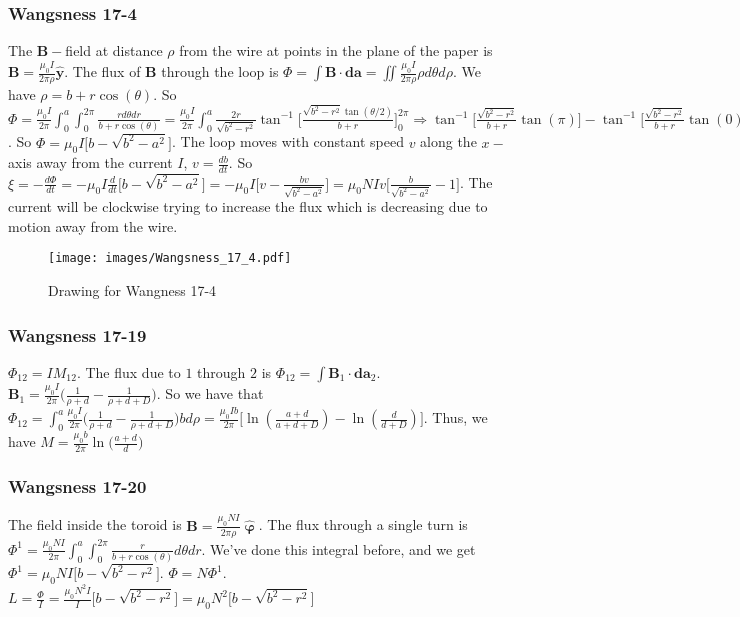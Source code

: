             \subsubsection{Wangsness 17-4}
            The $\mathbf{B}-$field at distance $\rho$ from the wire at points in the plane of the paper is $\mathbf{B} = \frac{\mu_0 I}{2\pi \rho} \hat{\mathbf{y}}$. The flux of $\mathbf{B}$ through the loop is $\Phi = \int \mathbf{B}\cdot \mathbf{da} = \iint \frac{\mu_0 I}{2\pi \rho}\rho d\theta d\rho$. We have $\rho = b+r\cos(\theta)$. So $\Phi = \frac{\mu_0 I}{2\pi} \int_{0}^{a} \int_{0}^{2\pi} \frac{r d\theta dr}{b+r\cos(\theta)} = \frac{\mu_0 I}{2\pi} \int_{0}^{a} \frac{2r}{\sqrt{b^2-r^2}}\tan^{-1}\big[\frac{\sqrt{b^2-r^2}\tan(\theta/2)}{b+r}\big]_{0}^{2\pi} \Rightarrow \tan^{-1}\big[\frac{\sqrt{b^2-r^2}}{b+r}\tan(\pi)\big] - \tan^{-1}\big[ \frac{\sqrt{b^2-r^2}}{b+r}\tan(0)\big]$. So $\Phi = \mu_0 I\big[b-\sqrt{b^2-a^2}\big]$. The loop moves with constant speed $v$ along the $x-$axis away from the current $I$, $v = \frac{db}{dt}$. So $\xi = -\frac{d\Phi}{dt} = -\mu_0 I \frac{d}{dt}\big[b-\sqrt{b^2-a^2}\big] = -\mu_0 I\big[ v-\frac{bv}{\sqrt{b^2-a^2}}\big] = \mu_0 NIv\big[ \frac{b}{\sqrt{b^2-a^2}}-1\big]$. The current will be clockwise trying to increase the flux which is decreasing due to motion away from the wire.
            \begin{figure}[htbp]
                \centering
                \captionsetup{type=figure}
                \texttt{[image: images/Wangsness\_17\_4.pdf]}
                \caption[Drawing for Wangsness 17-4]{Drawing for Wangness 17-4}
            \end{figure}
            \subsubsection{Wangsness 17-19}
            $\Phi_{12} = IM_{12}$. The flux due to $1$ through $2$ is $\Phi_{12} = \int \mathbf{B}_1 \cdot \mathbf{da}_2$. $\mathbf{B}_1 = \frac{\mu_0 I}{2\pi} \big( \frac{1}{\rho+d}- \frac{1}{\rho+d+D}\big)$. So we have that $\Phi_{12} = \int_{0}^{a} \frac{\mu_0 I}{2\pi} \big(\frac{1}{\rho+d}- \frac{1}{\rho+d+D}\big) bd\rho = \frac{\mu_0 Ib}{2\pi}\big[ \ln(\frac{a+d}{a+d+D}) - \ln(\frac{d}{d+D})\big]$. Thus, we have $M = \frac{\mu_0 b}{2\pi} \ln\big(\frac{a+d}{d}\big)$
            \subsubsection{Wangsness 17-20}
            The field inside the toroid is $\mathbf{B} = \frac{\mu_0 NI}{2\pi \rho} \hat{\boldsymbol{\upvarphi}}$. The flux through a single turn is $\Phi^1 = \frac{\mu_0 NI}{2\pi} \int_{0}^{a} \int_{0}^{2\pi} \frac{r}{b+r\cos(\theta)}d\theta dr$. We've done this integral before, and we get $\Phi^1= \mu_0 NI\big[b-\sqrt{b^2-r^2}\big]$. $\Phi = N\Phi^1$. $L = \frac{\Phi}{I} = \frac{\mu_0 N^2 I}{I} \big[b-\sqrt{b^2-r^2}\big] = \mu_0 N^2 \big[b-\sqrt{b^2-r^2}\big]$
